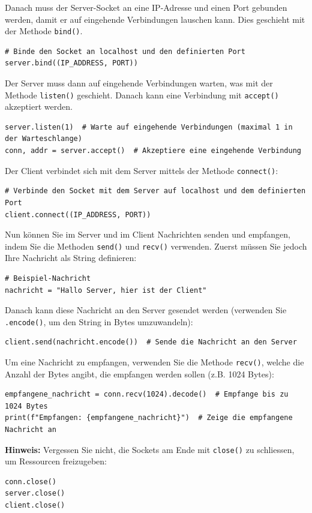 \begin{myexercise}
    Danach muss der Server-Socket an eine \gls{IP}-Adresse und einen Port gebunden werden, damit er auf eingehende Verbindungen lauschen kann. Dies geschieht mit der Methode \lstinline|bind()|.
    \begin{lstlisting}
# Binde den Socket an localhost und den definierten Port
server.bind((IP_ADDRESS, PORT))
    \end{lstlisting}

    Der Server muss dann auf eingehende Verbindungen warten, was mit der Methode \lstinline|listen()| geschieht. Danach kann eine Verbindung mit \lstinline|accept()| akzeptiert werden.
    \begin{lstlisting}
server.listen(1)  # Warte auf eingehende Verbindungen (maximal 1 in der Warteschlange)
conn, addr = server.accept()  # Akzeptiere eine eingehende Verbindung
    \end{lstlisting}

    Der Client verbindet sich mit dem Server mittels der Methode \lstinline|connect()|:
    \begin{lstlisting}
# Verbinde den Socket mit dem Server auf localhost und dem definierten Port
client.connect((IP_ADDRESS, PORT))
    \end{lstlisting}
    Nun können Sie im Server und im Client Nachrichten senden und empfangen, indem Sie die Methoden \lstinline|send()| und \lstinline|recv()| verwenden. Zuerst müssen Sie jedoch Ihre Nachricht als String definieren:
    \begin{lstlisting}
# Beispiel-Nachricht
nachricht = "Hallo Server, hier ist der Client"
    \end{lstlisting}
    Danach kann diese Nachricht an den Server gesendet werden (verwenden Sie \texttt{.encode()}, um den String in Bytes umzuwandeln):
    \begin{lstlisting}
client.send(nachricht.encode())  # Sende die Nachricht an den Server
    \end{lstlisting}
    Um eine Nachricht zu empfangen, verwenden Sie die Methode \lstinline|recv()|, welche die Anzahl der Bytes angibt, die empfangen werden sollen (z.B. 1024 Bytes):
    \begin{lstlisting}
empfangene_nachricht = conn.recv(1024).decode()  # Empfange bis zu 1024 Bytes
print(f"Empfangen: {empfangene_nachricht}")  # Zeige die empfangene Nachricht an
    \end{lstlisting}
    \textbf{Hinweis:} Vergessen Sie nicht, die Sockets am Ende mit \lstinline|close()| zu schliessen, um Ressourcen freizugeben:
    \begin{lstlisting}
conn.close()
server.close()
client.close()
     \end{lstlisting}


\end{myexercise}
